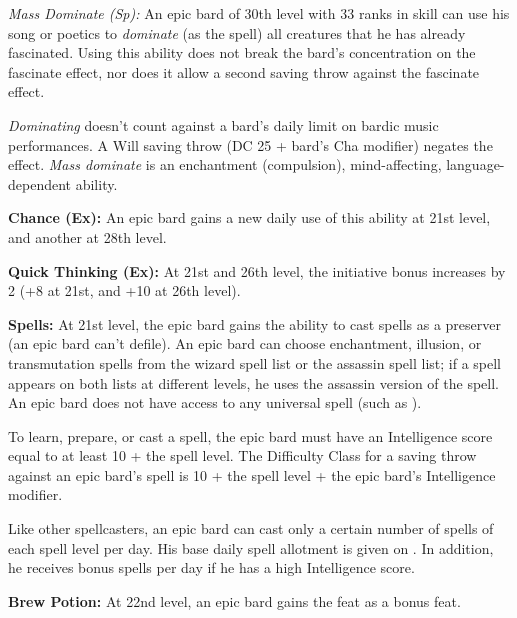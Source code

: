 \textit{Mass Dominate (Sp):} An epic bard of 30th level with 33 ranks in  skill can use his song or poetics to \emph{dominate} (as the  spell) all creatures that he has already fascinated. Using this ability does not break the bard's concentration on the fascinate effect, nor does it allow a second saving throw against the fascinate effect.

\emph{Dominating} doesn't count against a bard's daily limit on bardic music performances. A Will saving throw (DC 25 + bard's Cha modifier) negates the effect. \emph{Mass dominate} is an enchantment (compulsion), mind-affecting, language-dependent ability.


\textbf{Chance (Ex):} An epic bard gains a new daily use of this ability at 21st level, and another at 28th level.

\textbf{Quick Thinking (Ex):} At 21st and 26th level, the initiative bonus increases by 2 (+8 at 21st, and +10 at 26th level).

\textbf{Spells:} At 21st level, the epic bard gains the ability to cast spells as a preserver (an epic bard can't defile). An epic bard can choose enchantment, illusion, or transmutation spells from the wizard spell list or the assassin spell list; if a spell appears on both lists at different levels, he uses the assassin version of the spell. An epic bard does not have access to any universal spell (such as ).


To learn, prepare, or cast a spell, the epic bard must have an Intelligence score equal to at least 10 + the spell level. The Difficulty Class for a saving throw against an epic bard's spell is 10 + the spell level + the epic bard's Intelligence modifier.

Like other spellcasters, an epic bard can cast only a certain number of spells of each spell level per day. His base daily spell allotment is given on . In addition, he receives bonus spells per day if he has a high Intelligence score.


\textbf{Brew Potion:} At 22nd level, an epic bard gains the  feat as a bonus feat.

